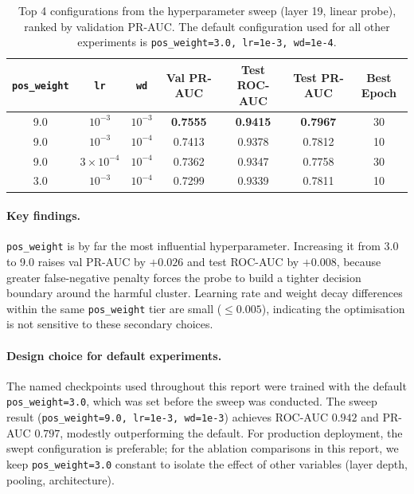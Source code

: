\documentclass[11pt,a4paper]{article}
\begin{document}
\begin{table}[H]
\centering
\caption{Top 4 configurations from the hyperparameter sweep (layer 19, linear probe),
         ranked by validation PR-AUC. The default configuration used for all other
         experiments is \texttt{pos\_weight=3.0, lr=1e-3, wd=1e-4}.}
\label{tab:hparam_top}
\begin{tabular}{ccccccc}
\toprule
\texttt{pos\_weight} & \texttt{lr} & \texttt{wd} & Val PR-AUC & Test ROC-AUC & Test PR-AUC & Best Epoch \\
\midrule
9.0 & $10^{-3}$       & $10^{-3}$  & \textbf{0.7555} & \textbf{0.9415} & \textbf{0.7967} & 30 \\
9.0 & $10^{-3}$       & $10^{-4}$  & 0.7413          & 0.9378          & 0.7812          & 10 \\
9.0 & $3\times10^{-4}$ & $10^{-4}$ & 0.7362          & 0.9347          & 0.7758          & 30 \\
3.0 & $10^{-3}$       & $10^{-4}$  & 0.7299          & 0.9339          & 0.7811          & 10 \\
\bottomrule
\end{tabular}
\end{table}

\paragraph{Key findings.}
\texttt{pos\_weight} is by far the most influential hyperparameter.
Increasing it from 3.0 to 9.0 raises val PR-AUC by $+0.026$ and test
ROC-AUC by $+0.008$, because greater false-negative penalty forces the probe
to build a tighter decision boundary around the harmful cluster.
Learning rate and weight decay differences within the same \texttt{pos\_weight}
tier are small ($\leq 0.005$), indicating the optimisation is not sensitive
to these secondary choices.

\paragraph{Design choice for default experiments.}
The named checkpoints used throughout this report were trained with the default
\texttt{pos\_weight=3.0}, which was set before the sweep was conducted.
The sweep result (\texttt{pos\_weight=9.0, lr=1e-3, wd=1e-3}) achieves
ROC-AUC $0.942$ and PR-AUC $0.797$, modestly outperforming the default.
For production deployment, the swept configuration is preferable; for the
ablation comparisons in this report, we keep \texttt{pos\_weight=3.0}
constant to isolate the effect of other variables (layer depth, pooling,
architecture).
\end{document}
